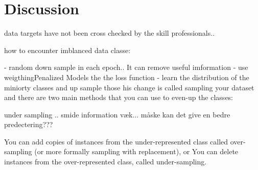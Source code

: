 \section{Discussion}
\label{sec:discussion}



data targets have not been cross checked by the skill professionals..


how to encounter imblanced data classe:

-  random down sample in each epoch.. It can remove useful imformation
- use weigthingPenalized Models the the loss function
- learn the distribution of the miniorty classes and up sample those
his change is called sampling your dataset and there are two main methods that you can use to even-up the classes:



under sampling .. smide information væk... måske kan det give en bedre predectering???




You can add copies of instances from the under-represented class called over-sampling (or more formally sampling with replacement), or
You can delete instances from the over-represented class, called under-sampling.